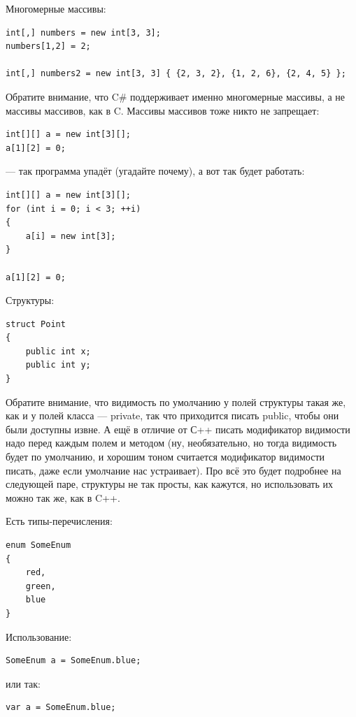 \documentclass{../../text-style}
\begin{document}
Многомерные массивы:

\begin{verbatim}
int[,] numbers = new int[3, 3];
numbers[1,2] = 2;
 
int[,] numbers2 = new int[3, 3] { {2, 3, 2}, {1, 2, 6}, {2, 4, 5} };
\end{verbatim}

Обратите внимание, что C\# поддерживает именно многомерные массивы, а не массивы массивов, как в C. Массивы массивов тоже никто не запрещает:

\begin{verbatim}
int[][] a = new int[3][];
a[1][2] = 0;
\end{verbatim}

--- так программа упадёт (угадайте почему), а вот так будет работать:

\begin{verbatim}
int[][] a = new int[3][];
for (int i = 0; i < 3; ++i)
{
    a[i] = new int[3];
}

a[1][2] = 0;
\end{verbatim}

Структуры:

\begin{verbatim}
struct Point
{
    public int x;
    public int y;
}
\end{verbatim}

Обратите внимание, что видимость по умолчанию у полей структуры такая же, как и у полей класса --- private, так что приходится писать public, чтобы они были доступны извне. А ещё в отличие от С++ писать модификатор видимости надо перед каждым полем и методом (ну, необязательно, но тогда видимость будет по умолчанию, и хорошим тоном считается модификатор видимости писать, даже если умолчание нас устраивает). Про всё это будет подробнее на следующей паре, структуры не так просты, как кажутся, но использовать их можно так же, как в C++.

Есть типы-перечисления:

\begin{verbatim}
enum SomeEnum
{
    red,
    green,
    blue
}
\end{verbatim}

Использование:

\begin{verbatim}
SomeEnum a = SomeEnum.blue;
\end{verbatim}

или так:

\begin{verbatim}
var a = SomeEnum.blue;
\end{verbatim}
\end{document}
